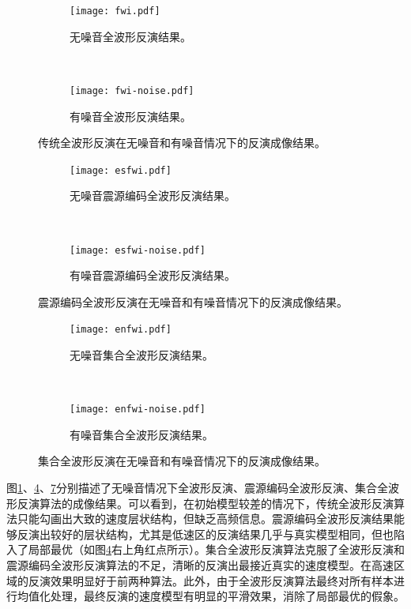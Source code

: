 \begin{figure}[ht]
    \centering
    \begin{subfigure}[b]{0.5\textwidth}
        \centering
        \texttt{[image: fwi.pdf]}
        \caption{无噪音全波形反演结果。}
        \label{fig:无噪音全波形反演结果}
    \end{subfigure}%
    ~
    \begin{subfigure}[b]{0.5\textwidth}
        \centering
        \texttt{[image: fwi-noise.pdf]}
        \caption{有噪音全波形反演结果。}
        \label{fig:有噪音全波形反演结果}
    \end{subfigure}
    \caption{传统全波形反演在无噪音和有噪音情况下的反演成像结果。}
\end{figure}

\begin{figure}[ht]
    \begin{subfigure}[b]{0.5\textwidth}
        \centering
        \texttt{[image: esfwi.pdf]}
        \caption{无噪音震源编码全波形反演结果。}
        \label{fig:无噪音震源编码全波形反演结果}
    \end{subfigure}%
    ~
    \begin{subfigure}[b]{0.5\textwidth}
        \centering
        \texttt{[image: esfwi-noise.pdf]}
        \caption{有噪音震源编码全波形反演结果。}
        \label{fig:有噪音震源编码全波形反演结果}
    \end{subfigure}
    \caption{震源编码全波形反演在无噪音和有噪音情况下的反演成像结果。}
\end{figure}

\begin{figure}[ht]
    \begin{subfigure}[b]{0.5\textwidth}
        \centering
        \texttt{[image: enfwi.pdf]}
        \caption{无噪音集合全波形反演结果。}
        \label{fig:无噪音集合全波形反演结果}
    \end{subfigure}%
    ~
    \begin{subfigure}[b]{0.5\textwidth}
        \centering
        \texttt{[image: enfwi-noise.pdf]}
        \caption{有噪音集合全波形反演结果。}
        \label{fig:有噪音集合全波形反演结果}
    \end{subfigure}
    \caption{集合全波形反演在无噪音和有噪音情况下的反演成像结果。}
\end{figure}

图\ref{fig:无噪音全波形反演结果}、\ref{fig:无噪音震源编码全波形反演结果}、\ref{fig:无噪音集合全波形反演结果}分别描述了无噪音情况下全波形反演、震源编码全波形反演、集合全波形反演算法的成像结果。可以看到，在初始模型较差的情况下，传统全波形反演算法只能勾画出大致的速度层状结构，但缺乏高频信息。震源编码全波形反演结果能够反演出较好的层状结构，尤其是低速区的反演结果几乎与真实模型相同，但也陷入了局部最优（如图\ref{fig:无噪音震源编码全波形反演结果}右上角红点所示）。集合全波形反演算法克服了全波形反演和震源编码全波形反演算法的不足，清晰的反演出最接近真实的速度模型。在高速区域的反演效果明显好于前两种算法。此外，由于全波形反演算法最终对所有样本进行均值化处理，最终反演的速度模型有明显的平滑效果，消除了局部最优的假象。

